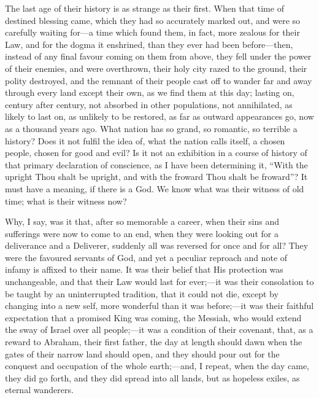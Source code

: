 The last age of their history is as strange as their first. When
that time of destined blessing came, which they had so accurately
marked out, and were so carefully waiting for—a time which found
them, in fact, more zealous for their Law, and for the dogma it
enshrined, than they ever had been before—then, instead of any final
favour coming on them from above, they fell under the power of
their enemies, and were overthrown, their holy city razed to the
ground, their polity destroyed, and the remnant of their people cast
off to wander far and away through every land except their own, as we
find them at this day; lasting on, century after century, not absorbed
in other populations, not annihilated, as likely to last on, as
unlikely to be restored, as far as outward appearances go, now as a
thousand years ago. What nation has so grand, so romantic, so terrible
a history? Does it not fulfil the idea of, what the nation calls
itself, a chosen people, chosen for good and evil? Is it not an
exhibition in a course of history of that primary declaration of
conscience, as I have been determining it, ``With the upright Thou
shalt be upright, and with the froward Thou shalt be froward''? It
must have a meaning, if there is a God. We know what was their witness
of old time; what is their witness now?

Why, I say, was it that, after so memorable a career, when their
sins and sufferings were now to come to an end, when they were looking
out for a deliverance and a Deliverer, suddenly all was reversed for
once and for all? They were the favoured servants of God, and yet a
peculiar reproach and note of infamy is affixed to their name. It was
their belief that His protection was unchangeable, and that their Law
would last for ever;—it was their consolation to be taught by an
uninterrupted tradition, that it could not die, except by changing
into a new self, more wonderful than it was before;—it was their
faithful expectation that a promised King was coming, the Messiah, who
would extend the sway of Israel over all people;—it was a
condition of their covenant, that, as a reward to Abraham, their first
father, the day at length should dawn when the gates of their narrow
land should open, and they should pour out for the conquest and
occupation of the whole earth;—and, I repeat, when the day came,
they did go forth, and they did spread into all lands, but as hopeless
exiles, as eternal wanderers.

